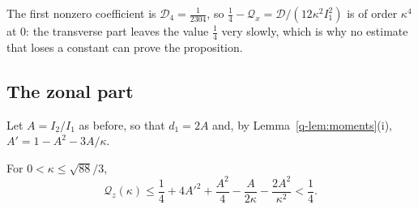 The first nonzero coefficient is $\mathcal D_4=\frac1{2304}$, so
$\frac14-\mathcal Q_x=\mathcal D/(12\kappa^2I_1^2)$ is of order $\kappa^4$ at $0$: the transverse part
leaves the value $\frac14$ very slowly, which is why no estimate that loses a
constant can prove the proposition.

\subsection{The zonal part}

Let $A=I_2/I_1$ as before, so that $d_1=2A$ and, by
Lemma~\ref{q-lem:moments}(i), $A'=1-A^2-3A/\kappa$.

\begin{proposition}\label{q-prop:zonal}
For $0<\kappa\le\sqrt{88}/3$,
\[
\mathcal Q_z(\kappa)\le\frac14+4A'^2+\frac{A^2}4-\frac A{2\kappa}-
\frac{2A^2}{\kappa^2}<\frac14 .
\]
\end{proposition}

